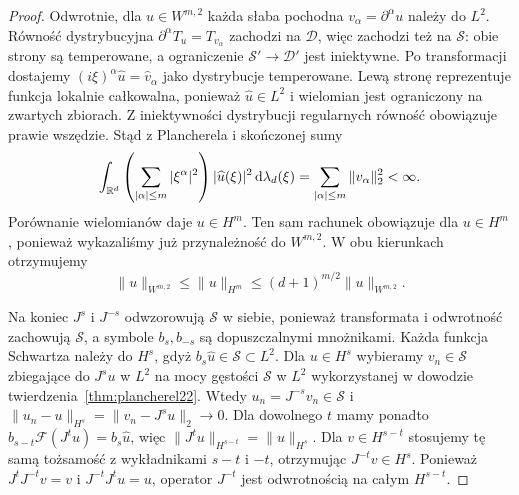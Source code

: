 \begin{proof}
Odwrotnie, dla $u\in W^{m,2}$ każda słaba
pochodna $v_\alpha=\partial^\alpha u$ należy
do $L^2$. Równość dystrybucyjna
$\partial^\alpha T_u=T_{v_\alpha}$ zachodzi
na $\mathcal D$, więc zachodzi też na $\mathcal S$:
obie strony są temperowane, a ograniczenie
$\mathcal S'\to\mathcal D'$ jest iniektywne.
Po transformacji dostajemy
$(i\xi)^\alpha\widehat u=\widehat v_\alpha$
jako dystrybucje temperowane.
Lewą stronę reprezentuje funkcja lokalnie
całkowalna, ponieważ $\widehat u\in L^2$
i wielomian jest ograniczony na zwartych zbiorach.
Z iniektywności dystrybucji regularnych
równość obowiązuje prawie wszędzie.
Stąd z Plancherela i skończonej sumy
\[
 \int_{\mathbb R^d}
 \left(\sum_{|\alpha|\le m}|\xi^\alpha|^2\right)
 |\widehat u(\xi)|^2\,\mathrm d\lambda_d(\xi)
 =\sum_{|\alpha|\le m}\|v_\alpha\|_2^2<\infty.
\]
Porównanie wielomianów daje $u\in H^m$.
Ten sam rachunek obowiązuje dla $u\in H^m$,
ponieważ wykazaliśmy już przynależność
do $W^{m,2}$. W obu kierunkach otrzymujemy
\[
 \|u\|_{W^{m,2}}\le\|u\|_{H^m}
 \le(d+1)^{m/2}\|u\|_{W^{m,2}}.
\]

Na koniec $J^s$ i $J^{-s}$ odwzorowują
$\mathcal S$ w siebie, ponieważ transformata
i odwrotność zachowują $\mathcal S$,
a symbole $b_s,b_{-s}$ są dopuszczalnymi
mnożnikami. Każda funkcja Schwartza należy
do $H^s$, gdyż $b_s\widehat u\in\mathcal S\subset L^2$.
Dla $u\in H^s$ wybieramy $v_n\in\mathcal S$
zbiegające do $J^su$ w $L^2$ na mocy
gęstości $\mathcal S$ w $L^2$ wykorzystanej w dowodzie
twierdzenia~\ref{thm:plancherel22}. Wtedy
$u_n=J^{-s}v_n\in\mathcal S$ i
$\|u_n-u\|_{H^s}=\|v_n-J^su\|_2\to0$.
Dla dowolnego $t$ mamy ponadto
$b_{s-t}\mathcal F(J^tu)=b_s\widehat u$,
więc $\|J^tu\|_{H^{s-t}}=\|u\|_{H^s}$.
Dla $v\in H^{s-t}$ stosujemy tę samą tożsamość
z wykładnikami $s-t$ i $-t$, otrzymując
$J^{-t}v\in H^s$.
Ponieważ $J^tJ^{-t}v=v$ i $J^{-t}J^tu=u$,
operator $J^{-t}$ jest odwrotnością na całym
$H^{s-t}$.
\end{proof}

